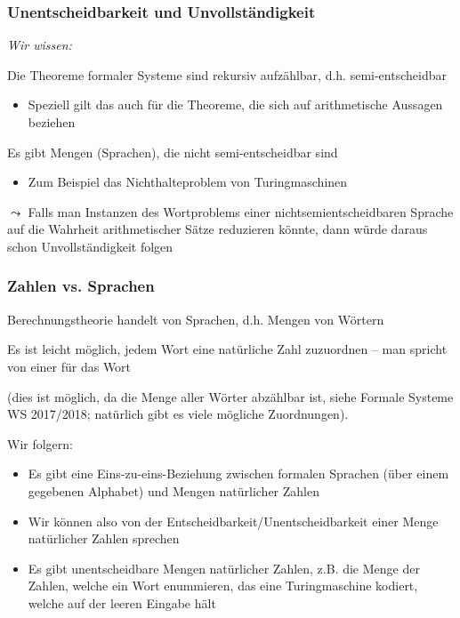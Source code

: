 \documentclass[aspectratio=1610,onlymath]{beamer}
\begin{document}
\begin{frame}\frametitle{Unentscheidbarkeit und Unvollständigkeit}

\emph{Wir wissen:}\medskip

Die Theoreme formaler Systeme sind rekursiv aufzählbar, d.h. semi-entscheidbar
\begin{itemize}
\item Speziell gilt das auch für die Theoreme, die sich auf arithmetische Aussagen beziehen
\end{itemize}\medskip

Es gibt Mengen (Sprachen), die nicht semi-entscheidbar sind
\begin{itemize}
\item Zum Beispiel das Nichthalteproblem von Turingmaschinen
\end{itemize}
\bigskip\pause

\alert{
$\leadsto$ Falls man Instanzen des Wortproblems einer nichtsemientscheidbaren Sprache auf die Wahrheit arithmetischer Sätze reduzieren könnte, dann würde daraus schon Unvollständigkeit folgen}

\end{frame}

\begin{frame}\frametitle{Zahlen vs. Sprachen}

Berechnungstheorie handelt von Sprachen, d.h. Mengen von Wörtern
\bigskip

Es ist leicht möglich, jedem Wort eine natürliche Zahl zuzuordnen -- man spricht von einer  für das Wort\\[0.5ex]
{\tiny(dies ist möglich, da die Menge aller Wörter abzählbar ist, siehe Formale Systeme WS 2017/2018; natürlich gibt es viele mögliche Zuordnungen).

}
\bigskip\pause

Wir folgern:
\begin{itemize}
\item Es gibt eine Eins-zu-eins-Beziehung zwischen formalen Sprachen (über einem gegebenen Alphabet) und Mengen natürlicher Zahlen
\item Wir können also von der Entscheidbarkeit/Unentscheidbarkeit einer Menge natürlicher Zahlen sprechen
\item Es gibt unentscheidbare Mengen natürlicher Zahlen, z.B. die Menge der Zahlen, welche ein Wort enummieren, das eine Turingmaschine kodiert, welche auf der leeren Eingabe hält
\end{itemize}

\end{frame}
\end{document}
